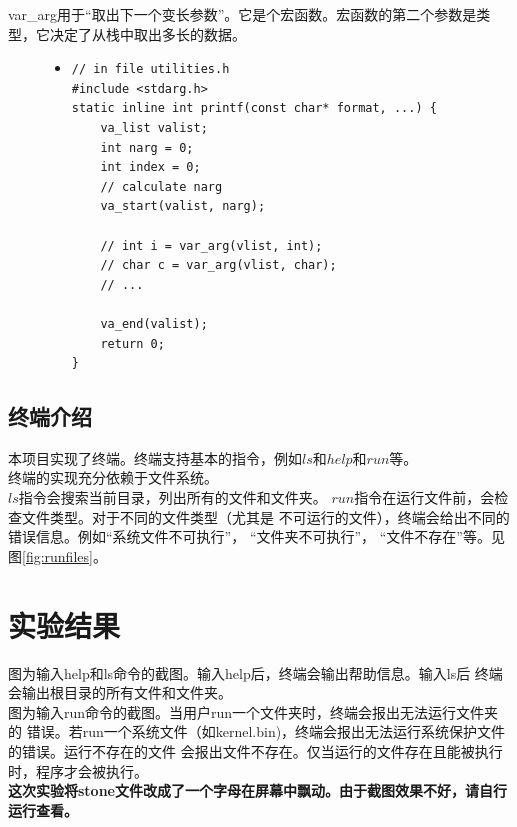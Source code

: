 \documentclass[a4paper]{article}
\begin{document}
    var\_arg用于``取出下一个变长参数''。它是个宏函数。宏函数的第二个参数是类型，它决定了从栈中取出多长的数据。
    \begin{figure}[!hbt]
    \begin{itemize}
    \item[] \begin{lstlisting}[style=mystyle, label=lst:printf, caption=printf实现代码主要部分]
// in file utilities.h    
#include <stdarg.h>
static inline int printf(const char* format, ...) {
    va_list valist;
    int narg = 0;
    int index = 0;
    // calculate narg
    va_start(valist, narg);

    // int i = var_arg(vlist, int);
    // char c = var_arg(vlist, char);
    // ...

    va_end(valist);
    return 0;
}
    \end{lstlisting}
    \end{itemize}
    \end{figure}

    \subsection{终端介绍}
    本项目实现了终端。终端支持基本的指令，例如$ls$和$help$和$run$等。\\
    
    终端的实现充分依赖于文件系统。\\
    $ls$指令会搜索当前目录，列出所有的文件和文件夹。
    $run$指令在运行文件前，会检查文件类型。对于不同的文件类型（尤其是
    不可运行的文件），终端会给出不同的错误信息。例如``系统文件不可执行''， 
    ``文件夹不可执行''， ``文件不存在''等。见图\ref{fig:runfiles}。
\section{实验结果} 
    图\label{fig:helpls}为输入help和ls命令的截图。输入help后，终端会输出帮助信息。输入ls后
    终端会输出根目录的所有文件和文件夹。\\
    
    图\label{fig:runfiles}为输入run命令的截图。当用户run一个文件夹时，终端会报出无法运行文件夹的
    错误。若run一个系统文件（如kernel.bin)，终端会报出无法运行系统保护文件的错误。运行不存在的文件
    会报出文件不存在。仅当运行的文件存在且能被执行时，程序才会被执行。 \\ 

    \textbf{这次实验将stone文件改成了一个字母在屏幕中飘动。由于截图效果不好，请自行运行查看。}
\end{document}
